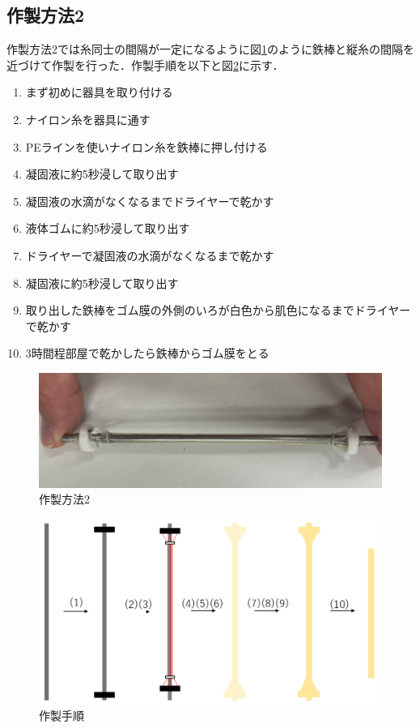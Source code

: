 \subsection{作製方法2}
作製方法2では糸同士の間隔が一定になるように図\ref{fig:20}のように鉄棒と縦糸の間隔を近づけて作製を行った．作製手順を以下と図\ref{fig:21}に示す．
\begin{enumerate}
  \item まず初めに器具を取り付ける
  \item ナイロン糸を器具に通す
  \item PEラインを使いナイロン糸を鉄棒に押し付ける
  \item 凝固液に約5秒浸して取り出す
  \item 凝固液の水滴がなくなるまでドライヤーで乾かす
  \item 液体ゴムに約5秒浸して取り出す
  \item ドライヤーで凝固液の水滴がなくなるまで乾かす
  \item 凝固液に約5秒浸して取り出す
  \item 取り出した鉄棒をゴム膜の外側のいろが白色から肌色になるまでドライヤーで乾かす
  \item 3時間程部屋で乾かしたら鉄棒からゴム膜をとる
\end{enumerate}
\begin{figure}[h]
  \centering  %
  \includegraphics[scale=0.2]{pic/19.jpg}
  \caption{作製方法2}
  \label{fig:20}
\end{figure}
\vspace{30mm}
\begin{figure}[h]
  \centering  %
  \includegraphics[scale=0.4]{pic/19.PNG}
  \caption{作製手順}
  \label{fig:21}
\end{figure}

